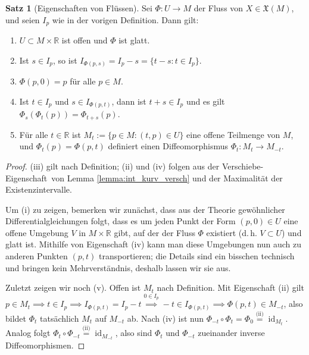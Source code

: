 \documentclass[a4paper]{scrreprt}
\numberwithin{equation}{chapter}
\DeclareMathOperator{\id}{id}
\newcommand{\R}{\mathbb{R}}
\theoremstyle{definition}
\newtheorem{satz}[defn]{Satz}
\begin{document}
\begin{satz}[Eigenschaften von Flüssen]
	Sei $\Phi\colon U \to M$ der Fluss von $X \in \mathfrak X(M)$, und seien $I_p$ wie in der vorigen Definition. Dann gilt:
	\begin{enumerate}[label=(\roman*)]
		\item $U \subset M \times \R$ ist offen und $\Phi$ ist glatt.
		\item Ist $s \in I_p$, so ist $I_{\Phi(p,s)} = I_p - s = \{t - s : t \in I_p\}$.
		\item $\Phi(p,0) = p$ für alle $p \in M$.
		\item Ist $t \in I_p$ und $s \in I_{\Phi(p,t)}$, dann ist $t+s \in I_p$ und es gilt $\Phi_s(\Phi_t(p)) = \Phi_{t+s}(p)$.
		\item Für alle $t\in\R$ ist $M_t := \{p \in M : (t,p) \in U\}$ eine offene Teilmenge von $M$, und $\Phi_t(p) = \Phi(p,t)$ definiert einen Diffeomorphismus $\Phi_t\colon M_t \to M_{-t}$.
	\end{enumerate}

	\begin{proof}
		(iii) gilt nach Definition; (ii) und (iv) folgen aus der \glqq Verschiebe-Eigenschaft\grqq\ von Lemma \ref{lemma:int_kurv_versch} und der Maximalität der Existenzintervalle.

		Um (i) zu zeigen, bemerken wir zunächst, dass aus der Theorie gewöhnlicher Differentialgleichungen folgt, dass es um jeden Punkt der Form $(p,0) \in U$ eine offene Umgebung $V$ in $M\times\R$ gibt, auf der der Fluss $\Phi$ existiert (d.\,h. $V\subset U$) und glatt ist. Mithilfe von Eigenschaft (iv) kann man diese Umgebungen nun auch zu anderen Punkten $(p,t)$ transportieren; die Details sind ein bisschen technisch und bringen kein Mehrverständnis, deshalb lassen wir sie aus.

		Zuletzt zeigen wir noch (v). Offen ist $M_t$ nach Definition. Mit Eigenschaft (ii) gilt $p \in M_t \implies t \in I_p \implies I_{\Phi(p,t)} = I_p - t \overset{0 \in I_p}{\implies} -t \in I_{\Phi(p,t)} \implies \Phi(p,t) \in M_{-t}$, also bildet $\Phi_t$ tatsächlich $M_t$ auf $M_{-t}$ ab. Nach (iv) ist nun $\Phi_{-t} \circ \Phi_t = \Phi_0 \overset{\text{(ii)}}{=} \id_{M_t}$. Analog folgt $\Phi_t \circ \Phi_{-t} \overset{\text{(ii)}}{=} \id_{M_{-t}}$, also sind $\Phi_t$ und $\Phi_{-t}$ zueinander inverse Diffeomorphismen.
	\end{proof}
\end{satz}
\end{document}
